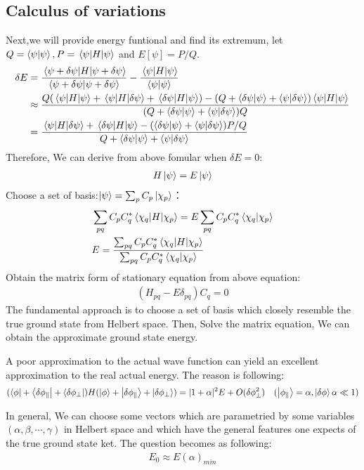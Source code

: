 \documentclass[UTF8]{article}
\numberwithin{equation}{section}
\begin{document}
\newpage
\subsection{Calculus of variations}
Next,we will provide energy funtional and find its extremum,
let$Q=\braket{\psi}{\psi},P=\mel{\psi}{H}{\psi}$ and $E[\psi]=P/Q$.
\begin{align*}
    \delta E & = \frac{\mel{\psi+\delta \psi}{H}{\psi +\delta \psi}}{\braket{\psi+\delta\psi}{\psi+\delta\psi}}
    -\frac{\mel{\psi}{H}{\psi}}{\braket{\psi}{\psi}}                                                                           \\
             & \approx \frac{Q(\mel{\psi}{H}{\psi}+\mel{\psi}{H}{\delta\psi}+\mel{\delta\psi}{H}{\psi})-(Q+\braket{\delta\psi}
        {\psi}+\braket{\psi}{\delta \psi})\mel{\psi}{H}{\psi}}{(Q+\braket{\delta\psi}
    {\psi}+\braket{\psi}{\delta \psi})Q}                                                                                       \\
             & =\frac{\mel{\psi}{H}{\delta\psi}+\mel{\delta\psi}{H}{\psi}-(\braket{\delta\psi}
        {\psi}+\braket{\psi}{\delta \psi})P/Q}{Q+\braket{\delta\psi}
        {\psi}+\braket{\psi}{\delta \psi}}
\end{align*}
Therefore, We can derive from above fomular when $\delta E=0$:
\begin{align*}
    H\ket{\psi}=E\ket{\psi}
\end{align*}
Choose a set of basis:$\ket{\psi}=\sum_p C_p\ket{\chi_p}$：
\begin{align*}
     & \sum_{pq}C_pC_q^* \mel{\chi_q}{H}{\chi_p}=E\sum_{pq}C_pC_q^*\braket{\chi_q}{\chi_p}
    \\&E=\frac{\sum_{pq}C_pC_q^* \mel{\chi_q}{H}{\chi_p}}{\sum_{pq}C_pC_q^*\braket{\chi_q}{\chi_p}}
\end{align*}
Obtain the matrix form of stationary equation from above equation:
\begin{align*}
    (H_{pq}-E\delta_{pq})C_q=0
\end{align*}
The fundamental approach is to choose a set of basis which closely resemble 
the true ground state from Helbert space. Then, Solve the   matrix equation,
We can obtain the approximate ground state energy.

A poor approximation to the actual wave function can yield an excellent 
approximation to the real actual energy. The reason is following:
\begin{align*}
    (\bra{\phi}+\bra{\delta \phi_{\parallel}}+\bra{\delta \phi_{\bot}})H(\ket{\phi}
    +\ket{\delta \phi_{\parallel}}+\ket{\delta \phi_{\bot}})=|1+\alpha|^2 E+O(\delta\phi^2_{\bot})
    \quad (\ket{\phi_{\parallel}}=\alpha ,\ket{\delta \phi} \alpha\ll 1)
\end{align*}

In general, We can choose some vectors which are parametried 
by some variables $(\alpha,\beta,\cdots,\gamma)$ in Helbert space and 
which have the general features one expects of the true ground state
ket. The question becomes as following:
\begin{align*}
    E_0 \approx E(\alpha)_{min}
\end{align*}
\end{document}
